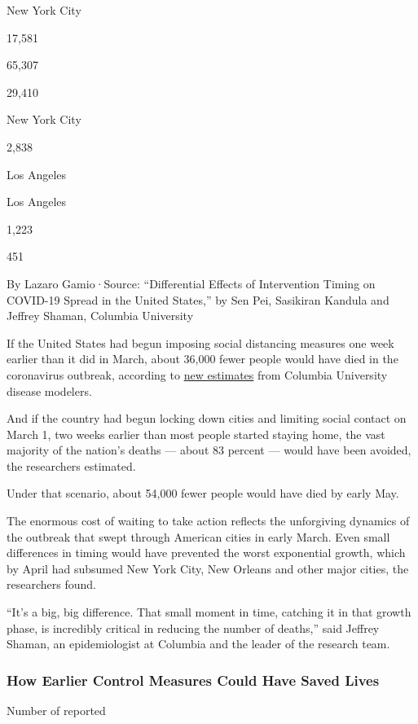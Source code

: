 New York City

17,581

65,307

29,410

New York City

2,838

Los Angeles

Los Angeles

1,223

451

By Lazaro Gamio·Source: ``Differential Effects of Intervention Timing on
COVID-19 Spread in the United States,'' by Sen Pei, Sasikiran Kandula
and Jeffrey Shaman, Columbia University

If the United States had begun imposing social distancing measures one
week earlier than it did in March, about 36,000 fewer people would have
died in the coronavirus outbreak, according to
\href{https://www.medrxiv.org/content/10.1101/2020.05.15.20103655v1}{new
estimates} from Columbia University disease modelers.

And if the country had begun locking down cities and limiting social
contact on March 1, two weeks earlier than most people started staying
home, the vast majority of the nation's deaths --- about 83 percent ---
would have been avoided, the researchers estimated.

Under that scenario, about 54,000 fewer people would have died by early
May.

The enormous cost of waiting to take action reflects the unforgiving
dynamics of the outbreak that swept through American cities in early
March. Even small differences in timing would have prevented the worst
exponential growth, which by April had subsumed New York City, New
Orleans and other major cities, the researchers found.

``It's a big, big difference. That small moment in time, catching it in
that growth phase, is incredibly critical in reducing the number of
deaths,'' said Jeffrey Shaman, an epidemiologist at Columbia and the
leader of the research team.

\hypertarget{how-earlier-control-measures-could-have-saved-lives}{%
\subsubsection{How Earlier Control Measures Could Have Saved
Lives}\label{how-earlier-control-measures-could-have-saved-lives}}

Number of reported

